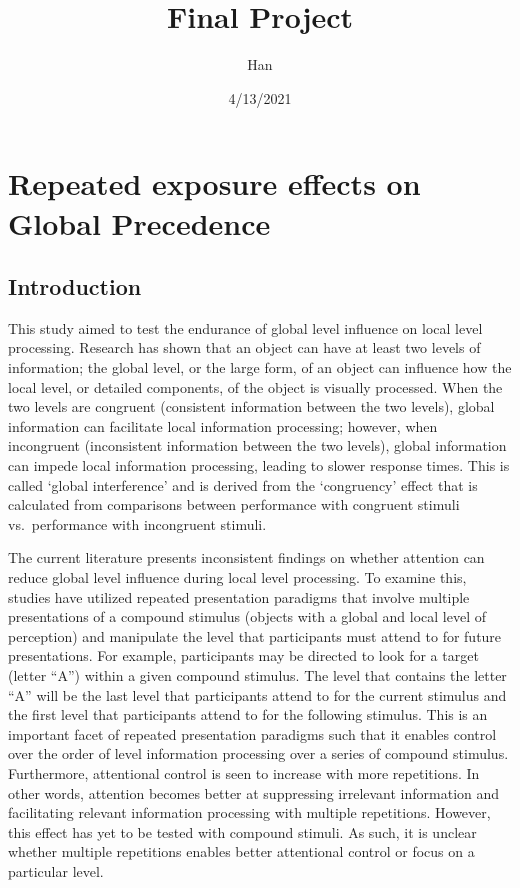 \documentclass[
]{article}
\title{Final Project}
\author{Han}
\date{4/13/2021}
\begin{document}
\maketitle

\hypertarget{repeated-exposure-effects-on-global-precedence}{%
\section{Repeated exposure effects on Global
Precedence}\label{repeated-exposure-effects-on-global-precedence}}

\hypertarget{introduction}{%
\subsection{Introduction}\label{introduction}}

This study aimed to test the endurance of global level influence on
local level processing. Research has shown that an object can have at
least two levels of information; the global level, or the large form, of
an object can influence how the local level, or detailed components, of
the object is visually processed. When the two levels are congruent
(consistent information between the two levels), global information can
facilitate local information processing; however, when incongruent
(inconsistent information between the two levels), global information
can impede local information processing, leading to slower response
times. This is called `global interference' and is derived from the
`congruency' effect that is calculated from comparisons between
performance with congruent stimuli vs.~performance with incongruent
stimuli.

The current literature presents inconsistent findings on whether
attention can reduce global level influence during local level
processing. To examine this, studies have utilized repeated presentation
paradigms that involve multiple presentations of a compound stimulus
(objects with a global and local level of perception) and manipulate the
level that participants must attend to for future presentations. For
example, participants may be directed to look for a target (letter
``A'') within a given compound stimulus. The level that contains the
letter ``A'' will be the last level that participants attend to for the
current stimulus and the first level that participants attend to for the
following stimulus. This is an important facet of repeated presentation
paradigms such that it enables control over the order of level
information processing over a series of compound stimulus. Furthermore,
attentional control is seen to increase with more repetitions. In other
words, attention becomes better at suppressing irrelevant information
and facilitating relevant information processing with multiple
repetitions. However, this effect has yet to be tested with compound
stimuli. As such, it is unclear whether multiple repetitions enables
better attentional control or focus on a particular level.
\end{document}
